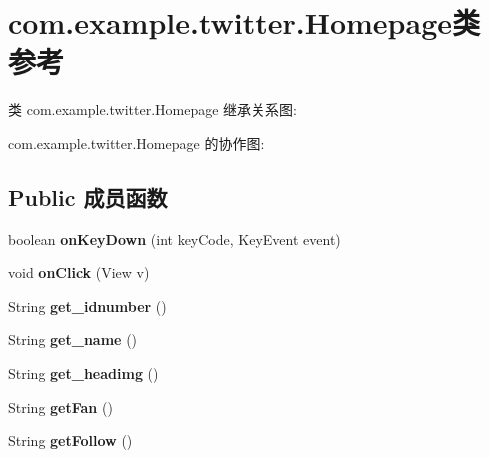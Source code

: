\hypertarget{classcom_1_1example_1_1twitter_1_1_homepage}{}\section{com.\+example.\+twitter.\+Homepage类 参考}
\label{classcom_1_1example_1_1twitter_1_1_homepage}


类 com.\+example.\+twitter.\+Homepage 继承关系图\+:


com.\+example.\+twitter.\+Homepage 的协作图\+:
\subsection*{Public 成员函数}
\begin{DoxyCompactItemize}
\item 
\mbox{\label{classcom_1_1example_1_1twitter_1_1_homepage_a0631a204d5486d2969727cf8ba4c33fb}} 
boolean {\bfseries on\+Key\+Down} (int key\+Code, Key\+Event event)
\item 
\mbox{\label{classcom_1_1example_1_1twitter_1_1_homepage_a349f4f0bc26bfcc86865e78b9b22a254}} 
void {\bfseries on\+Click} (View v)
\item 
\mbox{\label{classcom_1_1example_1_1twitter_1_1_homepage_a11155463064dbb58f34c2daf537bea09}} 
String {\bfseries get\+\_\+idnumber} ()
\item 
\mbox{\label{classcom_1_1example_1_1twitter_1_1_homepage_aeb7710cd15537ecb1428324bc89797d3}} 
String {\bfseries get\+\_\+name} ()
\item 
\mbox{\label{classcom_1_1example_1_1twitter_1_1_homepage_a816331141a5e04b05cf5f16479714098}} 
String {\bfseries get\+\_\+headimg} ()
\item 
\mbox{\label{classcom_1_1example_1_1twitter_1_1_homepage_ab07a1f62c1f700daf5001c12d31f0eb0}} 
String {\bfseries get\+Fan} ()
\item 
\mbox{\label{classcom_1_1example_1_1twitter_1_1_homepage_a5744730693b63e378907fb8f7c0e36a4}} 
String {\bfseries get\+Follow} ()
\end{DoxyCompactItemize}
